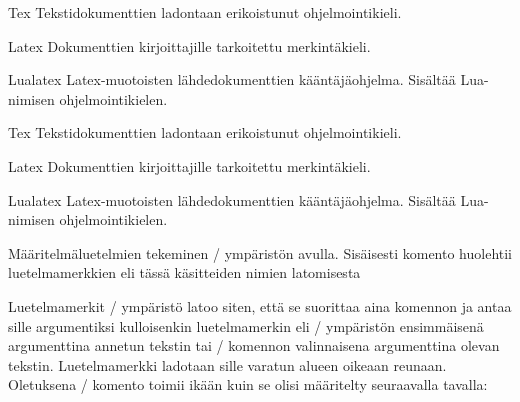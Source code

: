 \begin{esimerkki*}

\begin{koodilohko}
\begin{list}{}{
    \renewcommand{\makelabel}[1]{\textsc{#1:}}
    \setlength{\leftmargin}{1.5em}
    \setlength{\labelwidth}{1.5em}
    \setlength{\itemindent}{1em}
    \setlength{\labelsep}{1em}
    \setlength{\itemsep}{.2ex}
  }
\item[Tex] Tekstidokumenttien ladontaan erikoistunut ohjelmointikieli.
\item[Latex] Dokumenttien kirjoittajille tarkoitettu merkintäkieli.
\item[Lualatex] Latex-muotoisten lähdedokumenttien kääntäjäohjelma.
  Sisältää Lua-nimi\-sen ohjelmointikielen.
\end{list}
\end{koodilohko}
  \begin{tulos}
    \begin{list}{}{
        \renewcommand{\makelabel}[1]{\textsc{#1:}}
        \setlength{\leftmargin}{1.5em}
        \setlength{\labelwidth}{1.5em}
        \setlength{\itemindent}{1em}
        \setlength{\labelsep}{1em}
        \setlength{\itemsep}{.2ex}
      }
    \item[Tex] Tekstidokumenttien ladontaan erikoistunut ohjelmointikieli.
    \item[Latex] Dokumenttien kirjoittajille tarkoitettu merkintäkieli.
    \item[Lualatex] Latex-muotoisten lähdedokumenttien kääntäjäohjelma.
      Sisältää Lua-nimi\-sen ohjelmointikielen.
    \end{list}
  \end{tulos}
  \caption{Määritelmäluetelmien tekeminen \-/ ympäristön
    avulla. Sisäisesti komento  huolehtii
    luetelmamerkkien eli tässä käsitteiden nimien latomisesta}
  \label{esim/list-makelabel}
\end{esimerkki*}

Luetelmamerkit \-/ ympäristö latoo siten, että se
suorittaa aina komennon  ja antaa sille argumentiksi
kulloisenkin luetelmamerkin eli \-/ ympäristön
ensimmäisenä argumenttina annetun tekstin tai \-/ komennon
valinnaisena argumenttina olevan tekstin. Luetelmamerkki ladotaan sille
varatun alueen oikeaan reunaan. Oletuksena \-/
komento toimii ikään kuin se olisi määritelty seuraavalla tavalla:

